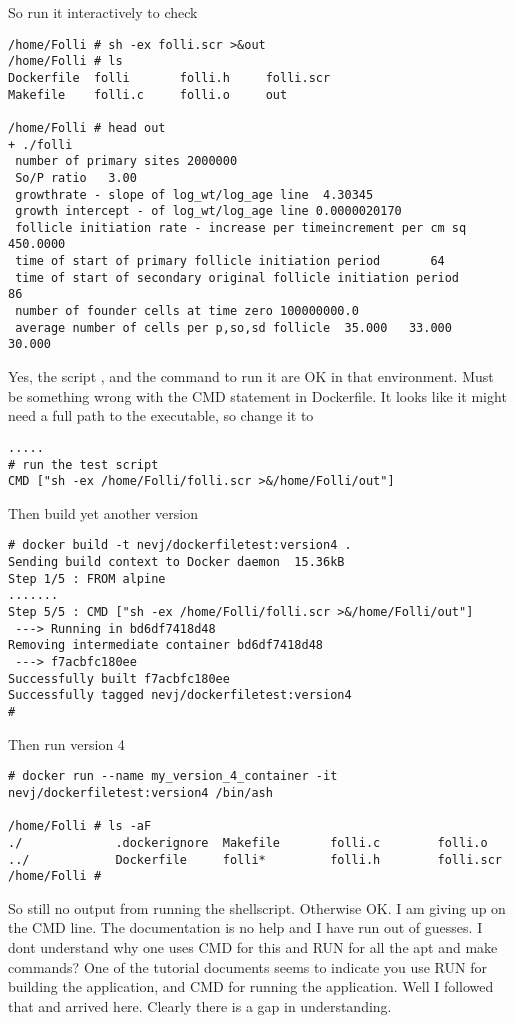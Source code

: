 \documentclass{article}  %
\begin{document}
So run it interactively to check
\begin{verbatim}
/home/Folli # sh -ex folli.scr >&out
/home/Folli # ls
Dockerfile  folli       folli.h     folli.scr
Makefile    folli.c     folli.o     out

/home/Folli # head out
+ ./folli
 number of primary sites 2000000
 So/P ratio   3.00
 growthrate - slope of log_wt/log_age line  4.30345
 growth intercept - of log_wt/log_age line 0.0000020170
 follicle initiation rate - increase per timeincrement per cm sq 450.0000
 time of start of primary follicle initiation period       64
 time of start of secondary original follicle initiation period       86
 number of founder cells at time zero 100000000.0
 average number of cells per p,so,sd follicle  35.000   33.000   30.000 
\end{verbatim}
 Yes, the script , and the command to run it are OK in that environment. Must be something wrong with the CMD statement in Dockerfile. It looks like it might need a full path to the executable, so change it to 
\begin{verbatim}
.....
# run the test script
CMD ["sh -ex /home/Folli/folli.scr >&/home/Folli/out"]
\end{verbatim}
Then build yet another version
\begin{verbatim}
# docker build -t nevj/dockerfiletest:version4 .
Sending build context to Docker daemon  15.36kB
Step 1/5 : FROM alpine
.......
Step 5/5 : CMD ["sh -ex /home/Folli/folli.scr >&/home/Folli/out"]
 ---> Running in bd6df7418d48
Removing intermediate container bd6df7418d48
 ---> f7acbfc180ee
Successfully built f7acbfc180ee
Successfully tagged nevj/dockerfiletest:version4
# 
\end{verbatim}
Then run version 4 
\begin{verbatim}
# docker run --name my_version_4_container -it nevj/dockerfiletest:version4 /bin/ash

/home/Folli # ls -aF
./             .dockerignore  Makefile       folli.c        folli.o
../            Dockerfile     folli*         folli.h        folli.scr
/home/Folli # 
\end{verbatim}
So still no output from running the shellscript. Otherwise OK. I am giving up on the CMD line. The documentation is no help and I have run out of guesses. I dont understand why one uses CMD for this and RUN for all the apt and make commands?  One of the tutorial  documents seems to indicate you use RUN for building the application, and CMD for running the application. Well I followed that and arrived  here.  Clearly there is a gap in understanding.
\end{document}
